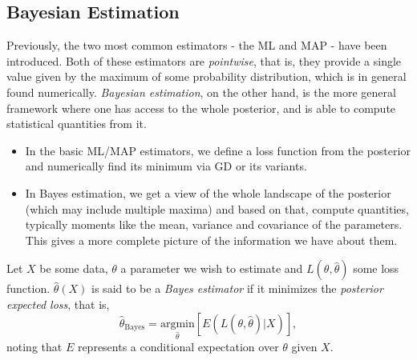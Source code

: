 \documentclass{article}
\begin{document}
\subsection{Bayesian Estimation}
Previously, the two most common estimators - the ML and MAP - have been introduced. Both of these estimators are \emph{pointwise}, that is, they provide a single value given by the maximum of some probability distribution, which is in general found numerically. \emph{Bayesian estimation}, on the other hand, is the more general framework where one has access to the whole posterior, and is able to compute statistical quantities from it.
\begin{itemize}
    \item In the basic ML/MAP estimators, we define a loss function from the posterior and numerically find its minimum via GD or its variants.
    \item In Bayes estimation, we get a view of the whole landscape of the posterior (which may include multiple maxima) and based on that, compute quantities, typically moments like the mean, variance and covariance of the parameters. This gives a more complete picture of the information we have about them.
\end{itemize}
Let $X$ be some data, $\theta$ a parameter we wish to estimate and $L(\theta,\hat{\theta})$ some loss function. $\hat{\theta}(X)$ is said to be a \emph{Bayes estimator} if it minimizes the \emph{posterior expected loss}, that is,
\begin{equation}
    \hat{\theta}_{\text{Bayes}} = \underset{\hat{\theta}}{\text{argmin}}\left[
    E(L(\theta,\hat{\theta}) | X)\right],
\end{equation}
noting that $E$ represents a conditional expectation over $\theta$ given $X$.
\end{document}
